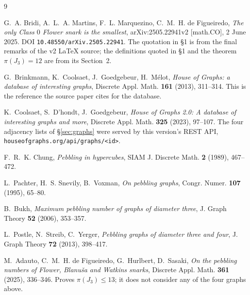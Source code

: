 \documentclass[11pt]{amsart}
\theoremstyle{remark}
\begin{document}
\begin{thebibliography}{9}

G.~A. Bridi, A.~L.~A. Martins, F.~L. Marquezino, C.~M.~H. de Figueiredo,
\emph{The only Class $0$ Flower snark is the smallest},
arXiv:2505.22941v2 [math.CO], 2 June 2025.
\newblock DOI \texttt{10.48550/arXiv.2505.22941}. The quotation in \S1 is from the
final remarks of the v2 \LaTeX{} source; the definitions quoted in \S1 and the
theorem $\pi(J_3)=12$ are from its Section~2.

G.~Brinkmann, K.~Coolsaet, J.~Goedgebeur, H.~M\'elot,
\emph{House of Graphs: a database of interesting graphs},
Discrete Appl. Math. \textbf{161} (2013), 311--314.
\newblock This is the reference the source paper cites for the database.

K.~Coolsaet, S.~D'hondt, J.~Goedgebeur,
\emph{House of Graphs 2.0: A database of interesting graphs and more},
Discrete Appl. Math. \textbf{325} (2023), 97--107.
\newblock The four adjacency lists of \S\ref{sec:graphs} were served by this
version's REST API, \texttt{houseofgraphs.org/api/graphs/<id>}.

F.~R.~K. Chung,
\emph{Pebbling in hypercubes},
SIAM J. Discrete Math. \textbf{2} (1989), 467--472.

L.~Pachter, H.~S. Snevily, B.~Voxman,
\emph{On pebbling graphs},
Congr. Numer. \textbf{107} (1995), 65--80.

B.~Bukh,
\emph{Maximum pebbling number of graphs of diameter three},
J. Graph Theory \textbf{52} (2006), 353--357.

L.~Postle, N.~Streib, C.~Yerger,
\emph{Pebbling graphs of diameter three and four},
J. Graph Theory \textbf{72} (2013), 398--417.

M.~Adauto, C.~M.~H. de Figueiredo, G.~Hurlbert, D.~Sasaki,
\emph{On the pebbling numbers of Flower, Blanu\v{s}a and Watkins snarks},
Discrete Appl. Math. \textbf{361} (2025), 336--346.
\newblock Proves $\pi(J_3)\le13$; it does not consider any of the four graphs
above.

\end{thebibliography}
\end{document}
